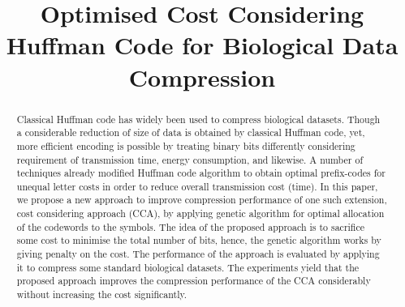 \documentclass{singlecol-new}
\makeatletter
\theoremstyle{TH}{
\newtheorem{lemma}{Lemma}
\newtheorem{theorem}[lemma]{Theorem}
\newtheorem{corrolary}[lemma]{Corrolary}
\newtheorem{conjecture}[lemma]{Conjecture}
\newtheorem{proposition}[lemma]{Proposition}
\newtheorem{claim}[lemma]{Claim}
\newtheorem{stheorem}[lemma]{Wrong Theorem}
}
\theoremstyle{THrm}{
\newtheorem{definition}{Definition}
\newtheorem{question}{Question}
\newtheorem{remark}{Remark}
\newtheorem{scheme}{Scheme}
}
\theoremstyle{THhit}{
\newtheorem{case}{Case}[section]
}
\def\tc{\textcolor{red}}
\def\BottomCatch{%
\vskip -10pt
\thispagestyle{empty}%
\begin{table}[b]%
\NINE\begin{tabular*}{\textwidth}{@{\extracolsep{\fill}}lcr@{}}%
\\[-12pt]
Copyright \copyright\ 2012 Inderscience Enterprises Ltd. & &%
\end{tabular*}%
\vskip -30pt%
\end{table}%
} \makeatother
\makeatother
\begin{document}
%

\thispagestyle{plain}

\setcounter{page}{1}

\LRH{}

\RRH{}



\PUBYEAR{ }




\title{Optimised Cost Considering Huffman Code for Biological Data Compression}

%
%

\begin{abstract}
Classical Huffman code has widely been used to compress biological datasets. Though a considerable reduction of size of data is obtained by classical Huffman code, yet, more efficient encoding is possible by treating binary bits differently considering requirement of transmission time, energy consumption, and likewise. A number of techniques already modified Huffman code algorithm to  obtain optimal prefix-codes for unequal letter costs in order to reduce overall transmission cost (time). In this paper, we propose a new approach to improve compression performance of one such extension, cost considering approach (CCA), by applying genetic algorithm for optimal allocation of the codewords to the symbols. %
The idea of the proposed approach is to sacrifice some cost to minimise the total number of bits, hence, the genetic algorithm works by giving penalty on the cost. The performance of the approach is evaluated by applying it to compress some standard biological datasets. The experiments yield that the proposed approach improves the compression performance of the CCA considerably without increasing the cost significantly.
\end{abstract}

\end{document}
